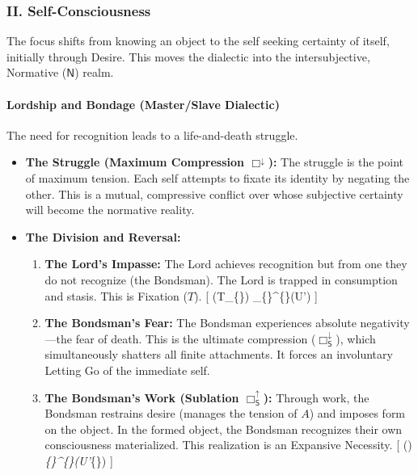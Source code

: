 \subsubsection{II. Self-Consciousness}\label{ii.-self-consciousness}

The focus shifts from knowing an object to the self seeking certainty of itself, initially through Desire. This moves the dialectic into the intersubjective, Normative (\(\mathsf{N}\)) realm.

\paragraph{Lordship and Bondage (Master/Slave Dialectic)}\label{lordship-and-bondage-masterslave-dialectic}

The need for recognition leads to a life-and-death struggle.

\begin{itemize}
\tightlist
\item
  \textbf{The Struggle (Maximum Compression \(\Box^{\downarrow}\)):} The struggle is the point of maximum tension. Each self attempts to fixate its identity by negating the other. This is a mutual, compressive conflict over whose subjective certainty will become the normative reality.
\item
  \textbf{The Division and Reversal:}

  \begin{enumerate}
  \def\labelenumi{\arabic{enumi}.}
  \tightlist
  \item
    \textbf{The Lord's Impasse:} The Lord achieves recognition but from one they do not recognize (the Bondsman). The Lord is trapped in consumption and stasis. This is Fixation (\(T\)). {[} (T\_\{\}) \implies \Box\_\{\}\^{}\{\downarrow\}(\neg U') \quad {} {]}
  \item
    \textbf{The Bondsman's Fear:} The Bondsman experiences absolute negativity---the fear of death. This is the ultimate compression (\(\Box_{\mathsf{S}}^{\downarrow}\)), which simultaneously shatters all finite attachments. It forces an involuntary Letting Go of the immediate self.
  \item
    \textbf{The Bondsman's Work (Sublation \(\Box_{\mathsf{S}}^{\uparrow}\)):} Through work, the Bondsman restrains desire (manages the tension of \(A\)) and imposes form on the object. In the formed object, the Bondsman recognizes their own consciousness materialized. This realization is an Expansive Necessity. {[} () \implies \Box\emph{\{\}\^{}\{\uparrow\}(U'}\{\}) {]}
  \end{enumerate}
\end{itemize}

